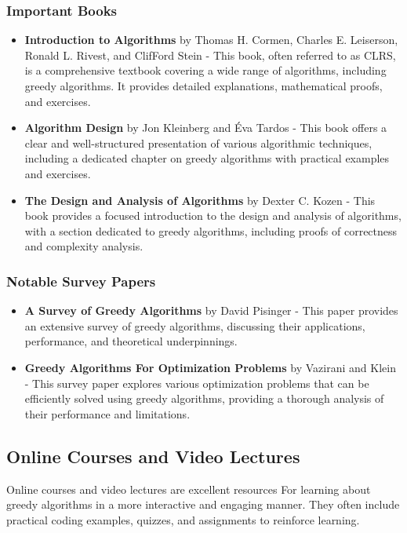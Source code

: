 \documentclass[12pt]{book} %
\begin{document}
\subsubsection*{Important Books}
\begin{itemize}
    \item \textbf{Introduction to Algorithms} by Thomas H. Cormen, Charles E. Leiserson, Ronald L. Rivest, and ClifFord Stein - This book, often referred to as CLRS, is a comprehensive textbook covering a wide range of algorithms, including greedy algorithms. It provides detailed explanations, mathematical proofs, and exercises.
    \item \textbf{Algorithm Design} by Jon Kleinberg and Éva Tardos - This book offers a clear and well-structured presentation of various algorithmic techniques, including a dedicated chapter on greedy algorithms with practical examples and exercises.
    \item \textbf{The Design and Analysis of Algorithms} by Dexter C. Kozen - This book provides a focused introduction to the design and analysis of algorithms, with a section dedicated to greedy algorithms, including proofs of correctness and complexity analysis.
\end{itemize}

\subsubsection*{Notable Survey Papers}
\begin{itemize}
    \item \textbf{A Survey of Greedy Algorithms} by David Pisinger - This paper provides an extensive survey of greedy algorithms, discussing their applications, performance, and theoretical underpinnings.
    \item \textbf{Greedy Algorithms For Optimization Problems} by Vazirani and Klein - This survey paper explores various optimization problems that can be efficiently solved using greedy algorithms, providing a thorough analysis of their performance and limitations.
\end{itemize}

\subsection{Online Courses and Video Lectures}
Online courses and video lectures are excellent resources For learning about greedy algorithms in a more interactive and engaging manner. They often include practical coding examples, quizzes, and assignments to reinforce learning.
\end{document}
